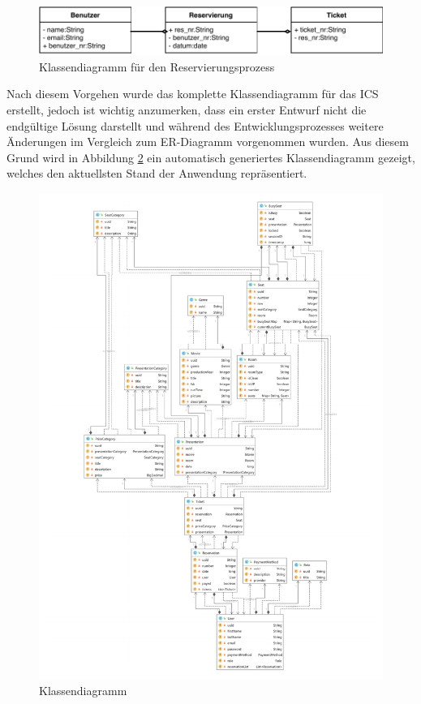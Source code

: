 		\begin{figure}[H]
			\centering 
			\includegraphics[width=15cm]{img/reservation_process.pdf}
			\captionsetup{format=hang}
			\caption[Klassendiagramm für den Reservierungsprozess]{\label{fig:reservation_process}Klassendiagramm für den Reservierungsprozess}
		\end{figure}
		
		Nach diesem Vorgehen wurde das komplette Klassendiagramm für das \ac{ICS} erstellt, jedoch ist wichtig anzumerken, dass ein erster Entwurf nicht die endgültige Lösung darstellt und während des Entwicklungsprozesses weitere Änderungen im Vergleich zum ER-Diagramm vorgenommen wurden. Aus diesem Grund wird in Abbildung \ref{fig:Klassendiagramm} ein automatisch generiertes Klassendiagramm gezeigt, welches den aktuellsten Stand der Anwendung repräsentiert.
		
		\begin{figure}[H]
			\centering 
			\includegraphics[width=15cm]{img/class_diagramm.pdf}
			\captionsetup{format=hang}
			\caption[Klassendiagramm]{\label{fig:Klassendiagramm}Klassendiagramm}
		\end{figure}
			
